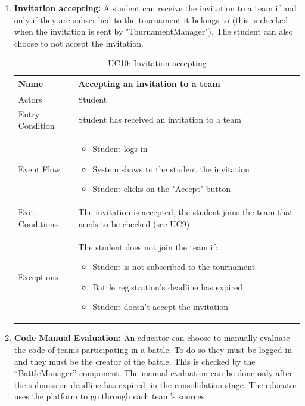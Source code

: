 \begin{enumerate}
   \newpage

   \item \textbf{Invitation accepting:}
   A student can receive the invitation to a team if and only if they are subscribed to the tournament it belongs to (this is checked when the invitation is sent by "TournamentManager"). The student can also choose to not accept the invitation.
   
   \begin{table}[H]
       \centering
       \begin{tabular}{|l|m{11cm}|}
        \hline
            Name & Accepting an invitation to a team\\
        \hline
            Actors & Student\\
        \hline
            Entry Condition & Student has received an invitation to a team\\
        \hline
            Event Flow & 
            \begin{itemize}
                \item Student logs in
                \item System shows to the student the invitation
                \item Student clicks on the "Accept" button
            \end{itemize}\\
        \hline
            Exit Conditions & The invitation is accepted, the student joins the team that needs to be checked (see UC9)\\
        \hline
            Exceptions & The student does not join the team if: 
            \begin{itemize}
                \item Student is not subscribed to the tournament
                \item Battle registration's deadline has expired
                \item Student doesn't accept the invitation
            \end{itemize}\\
        \hline
       \end{tabular}
       \caption{UC10: Invitation accepting}
       \label{tab:uc10}
   \end{table}

   \newpage
   
   \item \textbf{Code Manual Evaluation:}
    An educator can choose to manually evaluate the code of teams participating in a battle. To do so they must be logged in and they must be the creator of the battle. This is checked by the “BattleManager” component. The manual evaluation can be done only after the submission deadline has expired, in the consolidation stage. The educator uses the platform to go through each team’s sources.
    

\end{enumerate}
